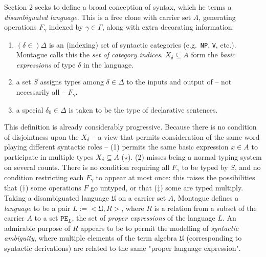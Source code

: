 Section 2 seeks to define a broad conception of syntax, which he terms a \emph{disambiguated language}. This is a free clone with carrier set $A$, generating operations $F_\gamma$ indexed by $\gamma \in \Gamma$, along with extra decorating information:

\begin{enumerate}
\item{$(\delta \in) \Delta$ is an (indexing) set of syntactic categories (e.g.~\texttt{NP}, \texttt{V}, etc.). Montague calls this the \emph{set of category indices}. $X_\delta \subseteq A$ form the \emph{basic expressions} of type $\delta$ in the language.}
\item{a set $S$ assigns types among $\delta \in \Delta$ to the inputs and output of -- not necessarily all -- $F_\gamma$.}
\item{a special $\delta_0 \in \Delta$ is taken to be the type of declarative sentences.}
\end{enumerate}

This definition is already considerably progressive. Because there is no condition of disjointness upon the $X_\delta$ -- a view that permits consideration of the same word playing different syntactic roles -- (1) permits the same basic expression $x \in A$ to participate in multiple types $X_\delta \subseteq A$ ($\star$). (2) misses being a normal typing system on several counts. There is no condition requiring all $F_\gamma$ to be typed by $S$, and no condition restricting each $F_\gamma$ to appear at most once: this raises the possibilities that ($\dag$) some operations $F$ go untyped, or that ($\ddag$) some are typed multiply.\\

Taking a disambiguated language $\mathfrak{U}$ on a carrier set $A$, Montague defines a \emph{language} to be a pair $L := <\mathfrak{U}, R>$, where $R$ is a relation from a subset of the carrier $A$ to a set $\texttt{PE}_L$, the set of \emph{proper expressions} of the language $L$. An admirable purpose of $R$ appears to be to permit the modelling of \emph{syntactic ambiguity}, where multiple elements of the term algebra $\mathfrak{U}$ (corresponding to syntactic derivations) are related to the same "proper language expression".\\


